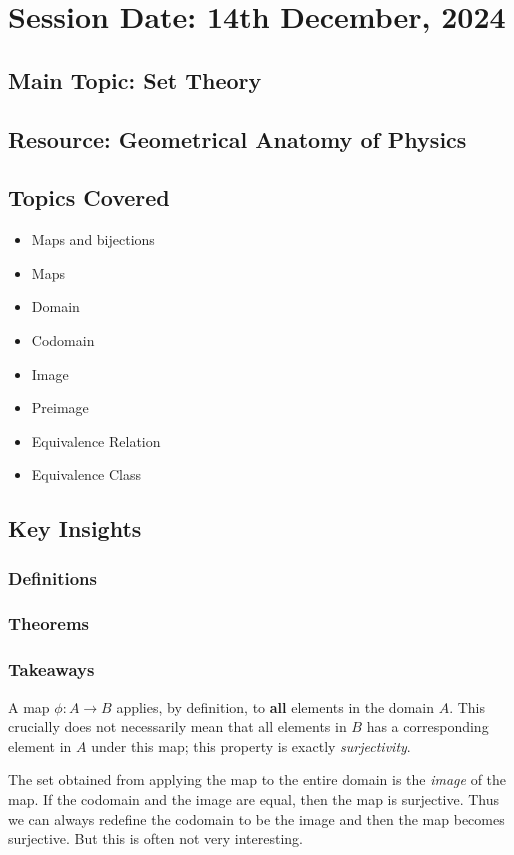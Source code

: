 \section{Session Date: 14th December, 2024}
\subsection*{Main Topic: Set Theory}
\subsection*{Resource: Geometrical Anatomy of Physics}
\subsection*{Topics Covered}
\begin{itemize}
    \item Maps and bijections
    \item Maps
    \item Domain
    \item Codomain
    \item Image
    \item Preimage
    \item Equivalence Relation
    \item Equivalence Class
\end{itemize}

\subsection*{Key Insights}
\subsubsection*{Definitions} 
\subsubsection*{Theorems}
\subsubsection*{Takeaways}
A map \(\phi : A \to B\) applies, by definition, to \textbf{all} elements in the domain \(A\). This crucially does not necessarily mean that all elements in \(B\) has a corresponding element in \(A\) under this map; this property is exactly \textit{surjectivity}. 

The set obtained from applying the map to the entire domain is the \textit{image} of the map. If the codomain and the image are equal, then the map is surjective. Thus we can always redefine the codomain to be the image and then the map becomes surjective. But this is often not very interesting.

